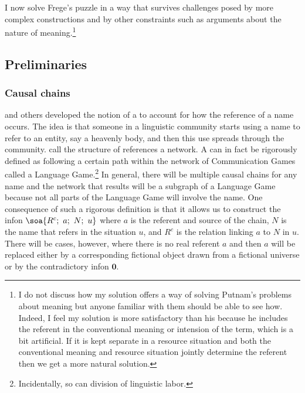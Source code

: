I now solve Frege's puzzle in a way that survives challenges posed by more complex constructions and by other constraints such as  arguments about the nature of meaning.\footnote{I do not discuss how my solution offers a way of solving Putnam's problems about meaning but anyone familiar with them should be able to see how. Indeed, I feel my solution is more satisfactory than his because he includes the referent in the conventional meaning or intension of the term, which is a bit artificial. If it is kept separate in a resource situation and both the conventional meaning and resource situation jointly determine the referent then we get a more natural solution.}


\subsection{Preliminaries}


\subsubsection{Causal chains}

\citet{kripke:nn} and others developed the notion of a  to account for how the reference of a name occurs. The idea is that someone in a linguistic community starts using a name to refer to an entity, say a heavenly body, and then this use spreads through the community. \citet[Chapter~7]{kp:cp} call the structure of references a network. A  can in fact be rigorously defined as following a certain path within the network of Communication Games called a Language Game.\footnote{Incidentally, so can  division of linguistic labor.} In general, there will be multiple causal chains for any name and the network that results will be a subgraph of a Language Game because not all parts of the Language Game will involve the name. One consequence of such a rigorous definition is that it allows us to construct the infon $\soa{R^c;\ a;\ N;\ u}$ where $a$ is the referent and source of the chain, $N$ is the name that refers in the situation $u$, and $R^c$ is the relation linking $a$ to $N$ in $u$. There will be cases, however, where there is no real referent $a$ and then $a$ will be replaced either by a corresponding fictional object drawn from a fictional universe or by the contradictory infon $\mathbf{0}$. 


